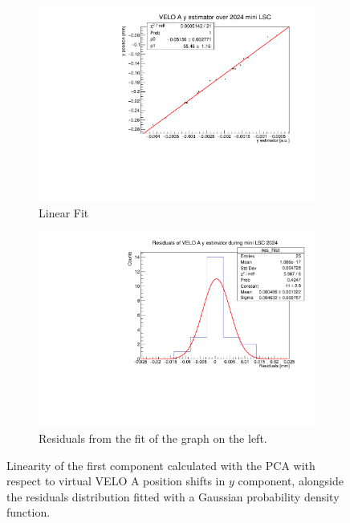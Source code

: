 \begin{figure}
    \centering
    \begin{subfigure}{0.48\textwidth}
    \includegraphics[width=\linewidth]{figures/y_fit_VELO_A_data.pdf}
    \caption{Linear Fit}\label{fig:y_veloA_fit_data}
    \end{subfigure}
    \begin{subfigure}{0.48\textwidth}
    \includegraphics[width=\linewidth]{figures/y_res_VELO_A_data.pdf}
    \caption{Residuals from the fit of the graph on the left. }\label{fig:y_veloA_res_data}
    \end{subfigure}
    \caption{Linearity of the first component calculated with the PCA with respect to virtual VELO A position shifts in $y$ component, alongside the residuals distribution fitted with a Gaussian probability density function.}
    \label{fig:y_veloA_data}
\end{figure}



